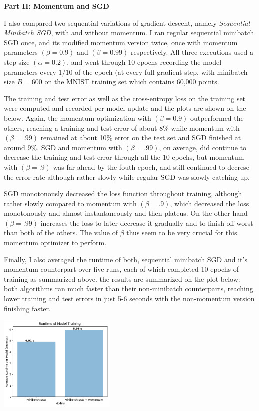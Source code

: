 \documentclass[10pt]{article}
\begin{document}
\begin{multicols}{2}
\noindent
\textbf{Part II: Momentum and SGD}\par 
I also compared two sequential variations of gradient descent, namely \textit{Sequential Minibatch SGD}, with and without momentum. I ran regular sequential minibatch SGD once, and its modified momentum version twice, once with momentum parameters $(\beta=0.9)$ and $(\beta=0.99)$ respectively. All three executions used a step size $(\alpha = 0.2)$, and went through 10 epochs recording the model parameters every $1/10$ of the epoch (at every full gradient step, with minibatch size $B=600$ on the MNIST training set which contains 60,000 points.\par
The training and test error as well as the cross-entropy loss on the training set were computed and recorded per model update and the plots are shown on the below. Again, the momentum optimization with $(\beta=0.9)$ outperformed the others, reaching a training and test error of about 8\% while momentum with $(\beta=.99)$ remained at about 10\% error on the test set and SGD finished at around 9\%. SGD and momentum with $(\beta=.99)$, on average, did continue to decrease the training and test error through all the 10 epochs, but momentum with $(\beta=.9)$ was far ahead by the fouth epoch, and still continued to decrese the error rate although rather slowly while regular SGD was slowly catching up. \par
SGD monotonously decreased the loss function throughout training, although rather slowly compared to momentum with $(\beta = .9)$, which decreased the loss monotonously and almost instantaneously and then plateus. On the other hand $(\beta=.99)$ increases the loss to later decrease it gradually and to finish off worst than both of the others. The value of $\beta$ thus seem to be very crucial for this momentum optimizer to perform. \par
Finally, I also averaged the runtime of both, sequential minibatch SGD and it's momentum counterpart over five runs, each of which completed 10 epochs of training as summarized above. the results are summarized on the plot below: both algorithms ran much faster than their non-minibatch counterparts, reaching lower training and test errors in just 5-6 seconds with the non-momentum version finishing faster.\par
\begin{center}
    \includegraphics[width=0.42\textwidth]{train_time_part2.png}

\end{center}
\end{multicols}
\end{document}

